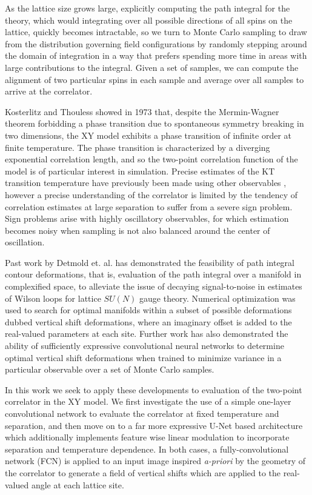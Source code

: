 \documentclass[12pt]{article}
\begin{document}
As the lattice size grows large, explicitly computing the path integral for the theory, which would integrating over all possible directions of all spins on the lattice,
quickly becomes intractable, so we turn to Monte Carlo sampling to draw from the distribution governing field configurations by randomly stepping around the domain
of integration in a way that prefers spending more time in areas with large contributions to the integral. Given a set of samples, we can compute the alignment of two
particular spins in each sample and average over all samples to arrive at the correlator.

Kosterlitz and Thouless \cite{KT} showed in 1973 that, despite the Mermin-Wagner theorem forbidding a phase transition due to spontaneous symmetry breaking
in two dimensions, the XY model exhibits a phase transition of infinite order at finite temperature. The phase transition is characterized by a diverging
exponential correlation length, and so the two-point correlation function of the model is of particular interest in simulation. Precise estimates of the KT transition
temperature have previously been made using other observables \cite{Hasenbusch_2005}, however a precise understanding of the correlator is limited by
the tendency of correlation estimates at large separation to suffer from a severe sign problem. Sign problems arise with highly oscillatory observables, for which
estimation becomes noisy when sampling is not also balanced around the center of oscillation.

Past work by Detmold et. al. \cite{Detmold_2021} has demonstrated the feasibility of path integral contour deformations, that is, evaluation
of the path integral over a manifold in complexified space, to alleviate the issue of decaying signal-to-noise in estimates of Wilson loops for lattice $SU(N)$ gauge theory.
Numerical optimization was used to search for optimal manifolds within a subset of possible deformations dubbed vertical shift deformations, where an imaginary offset is added to the
real-valued parameters at each site. Further work \cite{detmold2023signaltonoiseimprovementneuralnetwork} has also demonstrated the ability of sufficiently expressive convolutional neural networks
to determine optimal vertical shift deformations when trained to minimize variance in a particular observable over a set of Monte Carlo samples.

In this work we seek to apply these developments to evaluation of the two-point correlator in the XY model. We first investigate the use of a simple one-layer
convolutional network to evaluate the correlator at fixed temperature and separation, and then move on to a far more expressive U-Net \cite{ronneberger2015unetconvolutionalnetworksbiomedical}
based architecture which additionally implements feature wise linear modulation \cite{perez2017filmvisualreasoninggeneral} to incorporate separation and temperature dependence. In both cases,
a fully-convolutional network (FCN) is applied to an input image inspired \textit{a-priori} by the geometry of the correlator to generate a field of vertical shifts which are applied to
the real-valued angle at each lattice site.
\end{document}
